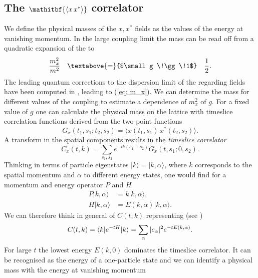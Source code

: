 \subsection[The $\langle xx^{*}\rangle$ correlator]{The {$\mathitbf{\langle x\,x^{*}\rangle}$} correlator}
We define the physical masses of the $x,x^{*}$ fields as the values of the energy at vanishing momentum. In the large coupling limit the mass can be read off from a quadratic expansion of the  \cite{Bianchi:2016cyv} to 
%
%
\begin{equation}
\frac{m_{x}^{2}}{m^{2}} \quad \textabove{=}{$\small g \!\gg \!1$} \quad \frac{1}{2}.
\end{equation}
%
%
The leading quantum corrections to the dispersion limit of the regarding fields have been computed in \cite{Giombi:2010bj}, leading to (\ref{eq: m_x}). We can determine the mass for different values of the coupling to estimate a dependence of $m_{x}^{2}$ of $g$. For a fixed value of $g$ one can calculate the physical mass on the lattice with timeslice correlation functions derived from the two-point functions
%
%
\begin{equation}
G_{x}(t_{1},s_{1};t_{2},s_{2}) = \langle x(t_{1},s_{1})\, x^{*}(t_{2},s_{2}) \rangle.
\end{equation}
%
%
A  transform in the spatial components results in the \textit{timeslice correlator}
%
%
\begin{equation}
C_{x}(t,k) = \sum\limits_{s_{1},s_{2}} e^{-ik(s_{1}-s_{2})} G_{x}(t,s_{1};0,s_{2}).
\end{equation}
%
%
Thinking in terms of particle eigenstates $\vert k \rangle = \vert k,\alpha \rangle$, where $k$ corresponds to the spatial momentum and $\alpha$ to different energy states, one would find for a momentum and energy operator $P$ and $H$
%
%
\begin{align}
P \vert k,\alpha \rangle &= k \vert k,\alpha \rangle, \\
H \vert k,\alpha \rangle &= E(k,\alpha) \vert k,\alpha \rangle.
\end{align}
%
%
We can therefore think in general of $C(t,k)$ representing (see \cite{montvay_lattice})
%
%
\begin{equation}
C(t,k) = \langle k\vert e^{-tH} \vert k \rangle = \sum\limits_{\alpha} \vert c_{\alpha} \vert^{2} e^{-t E(k,\alpha)}.
\raisetag{-8pt}
\end{equation}
%
%
For large $t$ the lowest energy $E(k,0)$ dominates the timeslice correlator. It can be recognised as the energy of a one-particle state and we can identify a physical mass with the energy at vanishing momentum
